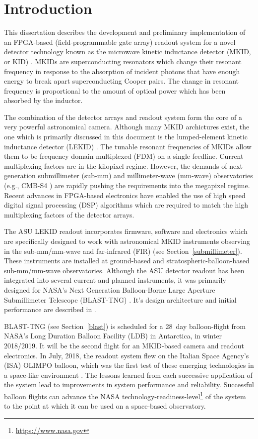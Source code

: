 \chapter{Introduction}\label{intro}

This dissertation describes the development and preliminary implementation of an FPGA-based (field-programmable gate array) readout system for a novel detector technology known as the microwave kinetic inductance detector (MKID, or KID) \citep{day2003broadband, mazin2005microwave}. MKIDs are superconducting resonators which change their resonant frequency in response to the absorption of incident photons that have enough energy to break apart superconducting Cooper pairs. The change in resonant frequency is proportional to the amount of optical power which has been absorbed by the inductor.

The combination of the detector arrays and readout system form the core of a very powerful astronomical camera. Although many MKID archictures exist, the one which is primarily discussed in this document is the lumped-element kinetic inductance detector (LEKID) \citep{doyle2008lumped}. The tunable resonant frequencies of MKIDs allow them to be frequency domain multiplexed (FDM) on a single feedline. Current multiplexing factors are in the kilopixel regime. However, the demands of next generation submillimeter (sub-mm) and millimeter-wave (mm-wave) observatories (e.g., CMB-S4 \cite{abitbol2017cmb}) are rapidly pushing the requirements into the megapixel regime. Recent advances in FPGA-based electronics have enabled the use of high speed digital signal processing (DSP) algorithms which are required to match the high multiplexing factors of the detector arrays.

The ASU LEKID readout incorporates firmware, software and electronics which are specifically designed to work with astronomical MKID instruments observing in the sub-mm/mm-wave and far-infrared (FIR) (see Section~\ref{submillimeter}). These instruments are installed at ground-based and stratospheric-balloon-based sub-mm/mm-wave observatories. Although the ASU detector readout has been integrated into several current and planned instruments, it was primarily designed for NASA's Next Generation Balloon-Borne Large Aperture Submillimeter Telescope (BLAST-TNG) \citep{dober}. It's design architecture and initial performance are described in \citet{gordon2016}.

BLAST-TNG (see Section~\ref{blast}) is scheduled for a 28~day balloon-flight from NASA's Long Duration Balloon Facility (LDB) in Antarctica, in winter 2018/2019. It will be the second flight for an MKID-based camera and readout electronics. In July, 2018, the readout system flew on the Italian Space Agency's (ISA) OLIMPO balloon, which was the first test of these emerging technologies in a space-like environment \citep{masi2019kinetic}. The lessons learned from each successive application of the system lead to improvements in system performance and reliability. Successful balloon flights can advance the NASA technology-readiness-level\footnote{\url{https://www.nasa.gov}} of the system to the point at which it can be used on a space-based observatory.

